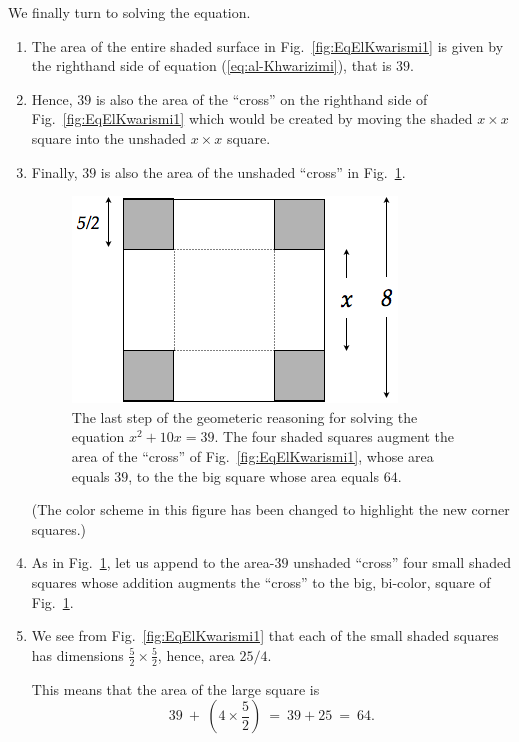 We finally turn to solving the equation.
\begin{enumerate}
\item
The area of the entire shaded surface in Fig.~\ref{fig:EqElKwarismi1} is given by the righthand side of equation (\ref{eq:al-Khwarizimi}), that is $39$.
\item
Hence, $39$ is also the area of the ``cross'' on the righthand side of Fig.~\ref{fig:EqElKwarismi1} which would be created by moving the shaded $x \times x$ square into the unshaded $x \times x$ square.
\item
Finally, $39$ is also the area of the unshaded ``cross'' in Fig.~\ref{fig:EqElKwarismi2}.
\begin{figure}[ht]
\begin{center}
       \includegraphics[scale=0.4]{FiguresArithmetic/EquationElKwarismi2}
\caption{The last step of the geometeric reasoning for solving the
  equation $x^2 + 10x = 39$.  The four shaded squares augment the area
  of the ``cross'' of Fig.~\ref{fig:EqElKwarismi1}, whose area equals
  $39$, to the the big square whose area equals $64$.}
       \label{fig:EqElKwarismi2}
\end{center}
\end{figure}
(The color scheme in this figure has been changed to highlight the new corner squares.)

\item
As in Fig.~\ref{fig:EqElKwarismi2}, let us append to the area-$39$ unshaded ``cross'' four small shaded squares whose addition augments the ``cross'' to the big, bi-color, square of
Fig.~\ref{fig:EqElKwarismi2}.

\item
We see from Fig.~\ref{fig:EqElKwarismi1} that each of the small shaded squares has dimensions $\frac{5}{2} \times \frac{5}{2}$, hence, area $25/4$.

This means that the area of the large square is
\[ 39 \ + \ \left( 4 \times \frac{5}{2} \right) \ = \ 39 + 25 \ = \ 64. \]
\end{enumerate}

